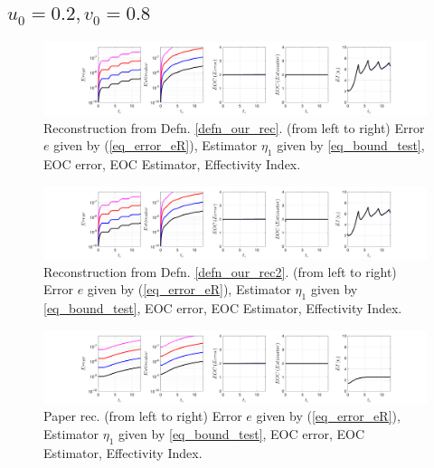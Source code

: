 \documentclass[12pt,a4paper]{article}
\numberwithin{equation}{section}
\theoremstyle{definition}
\begin{document}
\subsection*{$u_0=0.2, v_0= 0.8$}
\begin{figure}[H]
	\hspace{-3cm}
	\includegraphics[scale=0.55]{fig_LeapFrogplots_1x5_sin_IC_harmonic_order_2_u2_v8_rec_george}	
	\caption{Reconstruction from Defn. \ref{defn_our_rec}. (from left to right) Error $e$ given by (\ref{eq_error_eR}), Estimator $\eta_1$ given by \ref{eq_bound_test},  EOC error, EOC Estimator, Effectivity Index.}
	\label{fig_all_in_one_our_rec_george_u2_v8}
\end{figure}
\begin{figure}[H]
	\hspace{-3cm}
	\includegraphics[scale=0.55]{fig_LeapFrogplots_1x5_sin_IC_harmonic_order_2_u2_v8_rec2}	
	\caption{Reconstruction from Defn. \ref{defn_our_rec2}. (from left to right) Error $e$ given by (\ref{eq_error_eR}), Estimator $\eta_1$ given by \ref{eq_bound_test},   EOC error, EOC Estimator, Effectivity Index.}
	\label{fig_all_in_one_our_rec_2_u2_v8}
\end{figure}

\begin{figure}[H]
	\hspace{-3cm}
	\includegraphics[scale=0.55]{fig_LeapFrogplots_1x5_sin_IC_harmonic_u2_v8_paperrec}	
	\caption{Paper rec. (from left to right) Error $e$ given by (\ref{eq_error_eR}), Estimator $\eta_1$ given by \ref{eq_bound_test},   EOC error, EOC Estimator, Effectivity Index.}
	\label{fig_all_in_one_paperrec_u02_v08}
\end{figure}
\end{document}
